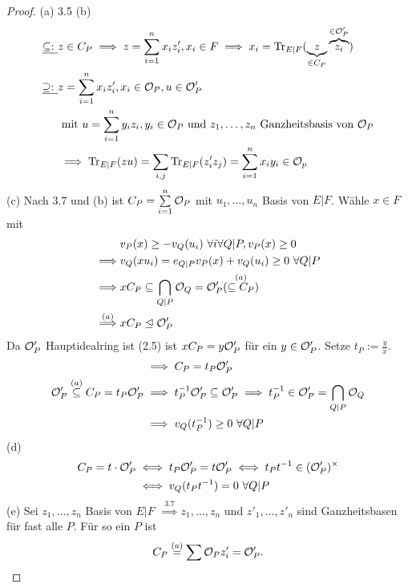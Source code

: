 \begin{proof}
    (a) 3.5 (b) 
    \begin{align*}
        \underline{\subseteq:~}& z \in C_P \implies z = \sum\limits_{i=1}^n x_iz'_i, x_i \in F \implies x_i = \operatorname{Tr}_{E|F}(\underbrace{z}_{\in C_P}\overbrace{z_i}^{\in \mathcal{O}'_P})\\
        \underline{\supseteq:~}& z = \sum\limits_{i=1}^n x_i z'_i, x_i \in \mathcal{O}_P, u \in \mathcal{O}'_P\\
        & \text{ mit } u = \sum\limits_{i=1}^n y_iz_i, y_i \in \mathcal{O}_P \text{ und } z_1, \ldots, z_n \text{ Ganzheitsbasis von } \mathcal{O}_P\\
        & \implies \operatorname{Tr}_{E|F}(zu) = \sum\limits_{i,j}\operatorname{Tr}_{E|F}(z'_iz_j) = \sum\limits_{i=1}^n x_iy_i \in \mathcal{O}_p
    \end{align*}
    (c) Nach 3.7 und (b) ist $C_P = \sum\limits_{i=1}^n \mathcal{O}_P$ mit $u_1,\ldots,u_n$ Basis von $E|F$. Wähle $x \in F$ mit 
    \begin{align*}
        & v_P(x) \geq -v_Q(u_i)~\forall i\forall Q|P, v_P(x) \geq 0\\
        \implies & v_Q(xu_i) = e_{Q|P}v_P(x) + v_Q(u_i) \geq 0 ~\forall Q|P\\
        \implies & xC_P \subseteq \bigcap\limits_{Q|P} \mathcal{O}_Q = \mathcal{O}'_P (\stackrel{(a)}{\subseteq C_P})\\
        \stackrel{(a)}{\implies} & xC_P \trianglelefteq \mathcal{O}'_P
    \end{align*}
    Da $\mathcal{O}'_P$ Hauptidealring ist (2.5) ist $xC_P = y\mathcal{O}'_P$ für ein $y \in \mathcal{O}'_P$. Setze $t_P := \frac{y}{x}$.
    \begin{align*}
        & \implies C_P = t_P \mathcal{O}'_P\\
        \mathcal{O}'_P \stackrel{(a)}{\subseteq} C_P = t_P \mathcal{O}'_P & \implies t^{-1}_P \mathcal{O}'_P \subseteq \mathcal{O}'_P \implies
        t^{-1}_P\in \mathcal{O}'_P=\bigcap_{Q|P} \mathcal{O}_Q\\
        & \implies v_Q(t^{-1}_P) \geq 0 ~\forall Q|P 
    \end{align*}
    (d) 
    \begin{align*}
        C_P = t\cdot \mathcal{O}'_P & \iff t_P \mathcal{O}'_P = t \mathcal{O}'_P \iff t_Pt^{-1} \in (\mathcal{O}'_P)^\times\\
        & \iff v_Q(t_Pt^{-1}) = 0 ~\forall Q|P
    \end{align*}
    (e) Sei $z_1,\ldots,z_n$ Basis von $E|F$ $\stackrel{3.7}{\implies} z_1, \ldots,z_n$ und $z'_1,\ldots,z'_n$ sind Ganzheitsbasen
    für fast alle $P$. Für so ein $P$ ist
    $$ C_P \stackrel{(a)}{=} \sum \mathcal{O}_P z'_i = \mathcal{O}'_P.$$
\end{proof}

